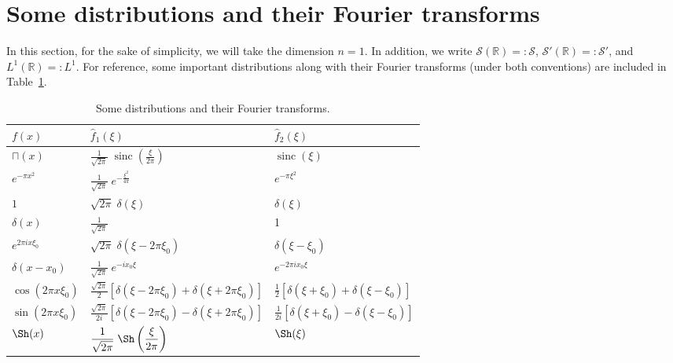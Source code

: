 \documentclass[12pt, letterpaper]{article}
\theoremstyle{plain}
\DeclareMathOperator{\sinc}{sinc}
\begin{document}
\section{Some distributions and their Fourier transforms}\label{sec3}
In this section, for the sake of simplicity, we will take the dimension $n = 1$. In addition, we write $\mathcal{S}(\mathbb{R}) =: \mathcal{S}$, $\mathcal{S}'(\mathbb{R}) =: \mathcal{S}'$, and $L^1(\mathbb{R}) =: L^1$. For reference, some important distributions along with their Fourier transforms (under both conventions) are included in Table~\ref{tab}.

\renewcommand{\arraystretch}{2}

\begin{table}[ht!]
    \centering
    \begin{tabular}{lll}
        \hline
        $f(x)$ & $\hat{f}_1(\xi)$ & $\hat{f}_2(\xi)$ \\[0.5em]
        \hline
        $\sqcap(x)$ & $\displaystyle\frac{1}{\sqrt{2\pi}}\;\sinc\left(\frac{\xi}{2\pi}\right)$ & $\sinc(\xi)$ \\[0.5em]
        $e^{-\pi x^2}$ & $\displaystyle\frac{1}{\sqrt{2\pi}}\;e^{-\tfrac{\xi^2}{4\pi}}$ & $e^{-\pi \xi^2}$ \\[0.5em]
        $1$ & $\sqrt{2\pi}\;\delta(\xi)$ & $\delta(\xi)$ \\[0.5em]
        $\delta(x)$ & $\displaystyle\frac{1}{\sqrt{2\pi}}$ & 1 \\[0.5em]
        $e^{2\pi i x\xi_0 }$ & $\sqrt{2\pi}\;\delta(\xi - 2\pi \xi_0)$ & $\delta(\xi - \xi_0)$ \\[0.5em]
        $\delta(x - x_0)$ & $\displaystyle\frac{1}{\sqrt{2\pi}}\;e^{-ix_0\xi}$ & $e^{-2\pi i x_0\xi}$ \\[0.5em]
        $\cos(2\pi x \xi_0)$ & $\displaystyle\frac{\sqrt{2\pi}}{2}\left[\delta(\xi - 2\pi \xi_0) + \delta(\xi + 2\pi \xi_0)\right]$ & $\displaystyle\frac{1}{2}\left[\delta(\xi + \xi_0) + \delta(\xi - \xi_0)\right]$ \\[0.5em]
        $\sin(2\pi x \xi_0)$ & $\displaystyle\frac{\sqrt{2\pi}}{2i}\left[\delta(\xi - 2\pi \xi_0) - \delta(\xi + 2\pi \xi_0)\right]$ & $\displaystyle\frac{1}{2i}\left[\delta(\xi + \xi_0) - \delta(\xi - \xi_0)\right]$ \\[0.5em]
        $\Sh(x)$ & $\displaystyle\frac{1}{\sqrt{2\pi}}\;\Sh\left(\frac{\xi}{2\pi}\right)$ & $\Sh(\xi)$ \\[0.5em]
        \hline
    \end{tabular}
    \caption{Some distributions and their Fourier transforms.}
    \label{tab}
\end{table}
\end{document}
